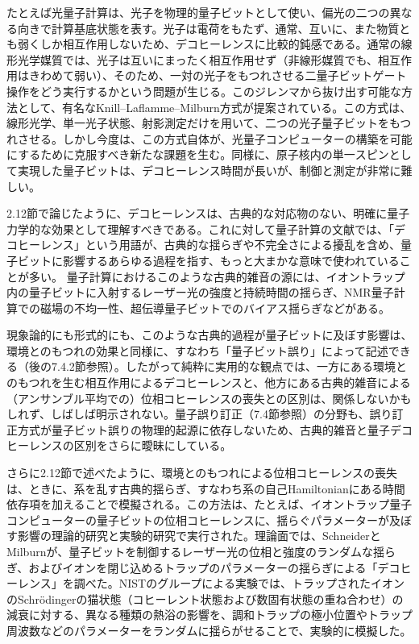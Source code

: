 たとえば光量子計算は、光子を物理的量子ビットとして使い、偏光の二つの異なる向きで計算基底状態を表す。光子は電荷をもたず、通常、互いに、また物質とも弱くしか相互作用しないため、デコヒーレンスに比較的鈍感である。通常の線形光学媒質では、光子は互いにまったく相互作用せず（非線形媒質でも、相互作用はきわめて弱い）、そのため、一対の光子をもつれさせる二量子ビットゲート操作をどう実行するかという問題が生じる。このジレンマから抜け出す可能な方法として、有名なKnill--Laflamme--Milburn方式\cite{ref348}が提案されている。この方式は、線形光学、単一光子状態、射影測定だけを用いて、二つの光子量子ビットをもつれさせる。しかし今度は、この方式自体が、光量子コンピューターの構築を可能にするために克服すべき新たな課題を生む。同様に、原子核内の単一スピンとして実現した量子ビットは、デコヒーレンス時間が長いが、制御と測定が非常に難しい。

2.12節で論じたように、デコヒーレンスは、古典的な対応物のない、明確に量子力学的な効果として理解すべきである。これに対して量子計算の文献では、「デコヒーレンス」という用語が、古典的な揺らぎや不完全さによる擾乱を含め、量子ビットに影響するあらゆる過程を指す、もっと大まかな意味で使われていることが多い。
\hypertarget{srcpage:303}{}\label{srcpage:303}
量子計算におけるこのような古典的雑音の源には、イオントラップ内の量子ビットに入射するレーザー光の強度\cite{ref349}と持続時間\cite{ref350}の揺らぎ、NMR量子計算での磁場の不均一性\cite{ref351}、超伝導量子ビットでのバイアス揺らぎ\cite{ref293}などがある。

現象論的にも形式的にも、このような古典的過程が量子ビットに及ぼす影響は、環境とのもつれの効果と同様に、すなわち「量子ビット誤り」によって記述できる（後の7.4.2節参照）。したがって純粋に実用的な観点では、一方にある環境とのもつれを生む相互作用によるデコヒーレンスと、他方にある古典的雑音による（アンサンブル平均での）位相コヒーレンスの喪失との区別は、関係しないかもしれず、しばしば明示されない。量子誤り訂正（7.4節参照）の分野も、誤り訂正方式が量子ビット誤りの物理的起源に依存しないため、古典的雑音と量子デコヒーレンスの区別をさらに曖昧にしている。

さらに2.12節で述べたように、環境とのもつれによる位相コヒーレンスの喪失は、ときに、系を乱す古典的揺らぎ、すなわち系の自己Hamiltonianにある時間依存項を加えることで模擬される。この方法は、たとえば、イオントラップ量子コンピューターの量子ビットの位相コヒーレンスに、揺らぐパラメーターが及ぼす影響の理論的研究\cite{ref349,ref352}と実験的研究\cite{ref125,ref353}で実行された。理論面では、SchneiderとMilburnが、量子ビットを制御するレーザー光の位相と強度のランダムな揺らぎ\cite{ref349}、およびイオンを閉じ込めるトラップのパラメーターの揺らぎによる「デコヒーレンス」を調べた。NISTのグループによる実験\cite{ref125,ref353}では、トラップされたイオンのSchrödingerの猫状態（コヒーレント状態および数固有状態の重ね合わせ）の減衰に対する、異なる種類の熱浴の影響を、調和トラップの極小位置やトラップ周波数などのパラメーターをランダムに揺らがせることで、実験的に模擬した。

